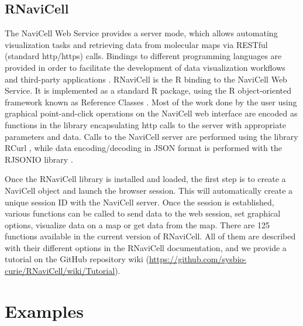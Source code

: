 \documentclass[article]{jss}
\begin{document}
\subsection{RNaviCell}

The NaviCell Web Service provides a server mode, which allows automating
visualization tasks and retrieving data from molecular maps via RESTful
(standard http/https) calls. Bindings to different programming languages are
provided in order to facilitate the development of data visualization workflows and
third-party applications \citep{bonnet2015navicell}. RNaviCell is the R binding
to the NaviCell Web Service. It is implemented as a standard R package, using
the R object-oriented framework known as Reference Classes \citep{hwR5}. Most
of the work done by the user using graphical point-and-click operations on the
NaviCell web interface are encoded as functions in the library encapsulating
http calls to the server with appropriate parameters and data. Calls to the
NaviCell server are performed using the library RCurl \citep{rcurl2015}, while
data encoding/decoding in JSON format is performed with the RJSONIO library
\citep{rjsonio2014}.

Once the RNaviCell library is installed and loaded, the first step is to create
a NaviCell object and launch the browser session. This will automatically create
a unique session ID with the NaviCell server. Once the session is established,
various functions can be called to send data to the web session, set graphical
options, visualize data on a map or get data from the map. There are 125
functions available in the current version of RNaviCell. All of them are
described with their different options in the RNaviCell documentation, and we
provide a tutorial on the GitHub repository wiki
(\url{https://github.com/sysbio-curie/RNaviCell/wiki/Tutorial}).  

\section[Examples]{Examples}

%

\end{document}
